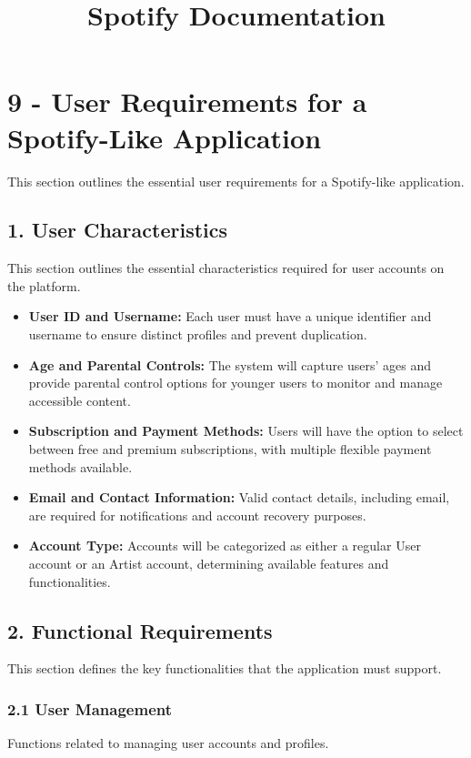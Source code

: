 \documentclass[a4paper,10pt]{article}
\title{Spotify Documentation}
\date{}
\begin{document}
\maketitle

\section*{9 - User Requirements for a Spotify-Like Application}
This section outlines the essential user requirements for a Spotify-like application.

\subsection*{1. User Characteristics}
This section outlines the essential characteristics required for user accounts on the platform.

\begin{itemize}[leftmargin=*]
    \item \textbf{User ID and Username:} Each user must have a unique identifier and username to ensure distinct profiles and prevent duplication.
    \item \textbf{Age and Parental Controls:} The system will capture users’ ages and provide parental control options for younger users to monitor and manage accessible content.
    \item \textbf{Subscription and Payment Methods:} Users will have the option to select between free and premium subscriptions, with multiple flexible payment methods available.
    \item \textbf{Email and Contact Information:} Valid contact details, including email, are required for notifications and account recovery purposes.
    \item \textbf{Account Type:} Accounts will be categorized as either a regular User account or an Artist account, determining available features and functionalities.
\end{itemize}

\subsection*{2. Functional Requirements}
This section defines the key functionalities that the application must support.

\subsubsection*{2.1 User Management}
Functions related to managing user accounts and profiles.
\end{document}
